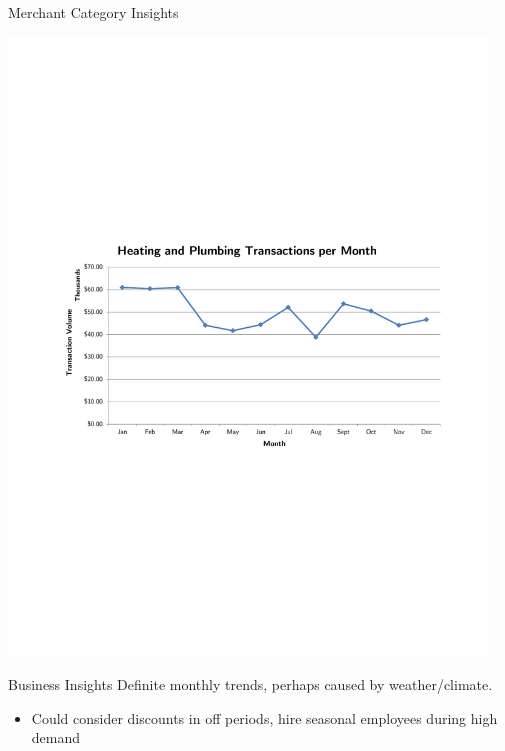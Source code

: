 \documentclass[xcolor=dvipsnames]{beamer}
\begin{document}
\begin{frame}[t]{Merchant Category Insights}
	\vspace{-6pt}
	\centerline{\includegraphics[width=0.95\textwidth]{heating-plumbing-tx}}
	\vspace{-8pt}
	\begin{block}{Business Insights}
		\small
		Definite monthly trends, perhaps caused by weather/climate.\\[-8pt]
		\begin{itemize}
			\item Could consider discounts in off periods, hire seasonal employees during high demand
		\end{itemize}
	\end{block}
\end{frame}

\end{document}
